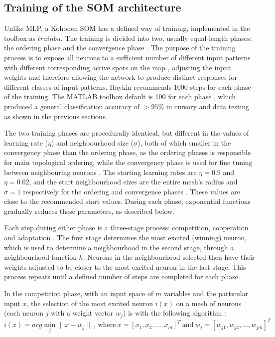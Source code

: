 \documentclass[10pt, oneside]{article}
\begin{document}
\subsection{Training of the SOM architecture} \label{subsec:training}
 
Unlike MLP, a Kohonen SOM has a defined way of training, implemented in the toolbox as $trainbu$. The training is divided into two, usually equal-length phases: the ordering phase and the convergence phase \cite[p. 23]{som-lecture}. The purpose of the training process is to expose all neurons to a sufficient number of different input patterns with different corresponding active spots on the map \cite[p. 429]{haykin2008}, adjusting the input weights and therefore allowing the network to produce distinct responses for different classes of input patterns. Haykin \cite[p. 435]{haykin2008} recommends 1000 steps for each phase of the training. The MATLAB toolbox default is 100 for each phase \cite{som-matlab}, which produced a general classification accuracy of $>95$\% in cursory and data testing as shown in the previous sections.

The two training phases are procedurally identical, but different in the values of learning rate ($\eta$) and neighbourhood size ($\sigma$), both of which smaller in the convergency phase than the ordering phase, as the ordering phases is responsible for main topological ordering, while the convergency phase is used for fine tuning between neighbouring neurons \cite[p. 23]{som-lecture}. The starting learning rates are $\eta=0.9$ and $\eta=0.02$, and the start neighbourhood sizes are the entire mesh's radius and $\sigma=1$ respectively for the ordering and convergence phases \cite{newsom-matlab}. These values are close to the recommended start values\cite[p. 23]{som-lecture}. During each phase, exponential functions gradually reduces these parameters, as described below.

Each step during either phase is a three-stage process: competition, cooperation and adaptation \cite[pp. 429-430]{haykin2008}. The first stage determines the most excited (winning) neuron, which is used to determine a neighbourhood in the second stage, through a neighbourhood function $h$. Neurons in the neighbourhood selected then have their weights adjusted to be closer to the most excited neuron in the last stage. This process repeats until a defined number of steps are completed for each phase.

In the competition phase, with an input space of $m$ variables and the particular input $x$, the selection of the most excited neuron $i(x)$ on a mesh of neurons (each neuron $j$ with a weight vector $w_j$) is with the following algorithm \cite[p. 430]{haykin2008}:
\begin{equation}
i(x) = arg \min_{j}\|x  - w_{j}\| \ \text{, where}\ x = [x_1, x_2, ..., x_m]^T \ \text{and} \ w_j = [w_{j1}, w_{j2}, ..., w_{jm}]^T
\end{equation}
\end{document}
